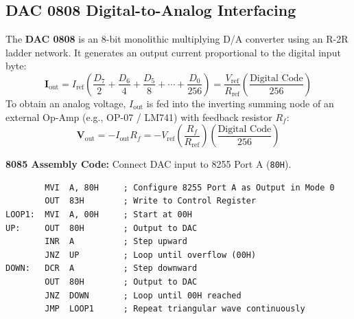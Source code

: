 \documentclass[12pt,a4paper]{article}
\begin{document}
\subsection{DAC 0808 Digital-to-Analog Interfacing}
\begin{tcolorbox}[defbox, title={DAC 0808 Specifications}]
The \textbf{DAC 0808} is an 8-bit monolithic multiplying D/A converter using an R-2R ladder network. It generates an output current proportional to the digital input byte:
\[
\mathbf{I_{\mathrm{out}}} = I_{\mathrm{ref}} \left( \frac{D_7}{2} + \frac{D_6}{4} + \frac{D_5}{8} + \cdots + \frac{D_0}{256} \right) = \frac{V_{\mathrm{ref}}}{R_{\mathrm{ref}}} \left( \frac{\text{Digital Code}}{256} \right)
\]
To obtain an analog voltage, $I_{\mathrm{out}}$ is fed into the inverting summing node of an external Op-Amp (e.g., OP-07 / LM741) with feedback resistor $R_f$:
\[
\mathbf{V_{\mathrm{out}}} = -I_{\mathrm{out}} R_f = -V_{\mathrm{ref}} \left(\frac{R_f}{R_{\mathrm{ref}}}\right) \left( \frac{\text{Digital Code}}{256} \right)
\]
\end{tcolorbox}

\begin{tcolorbox}[examplebox, title={Generating a Triangular Waveform with DAC 0808}]
\textbf{8085 Assembly Code:} Connect DAC input to 8255 Port A (\texttt{80H}).
\begin{verbatim}
        MVI  A, 80H     ; Configure 8255 Port A as Output in Mode 0
        OUT  83H        ; Write to Control Register
LOOP1:  MVI  A, 00H     ; Start at 00H
UP:     OUT  80H        ; Output to DAC
        INR  A          ; Step upward
        JNZ  UP         ; Loop until overflow (00H)
DOWN:   DCR  A          ; Step downward
        OUT  80H        ; Output to DAC
        JNZ  DOWN       ; Loop until 00H reached
        JMP  LOOP1      ; Repeat triangular wave continuously
\end{verbatim}
\end{tcolorbox}
\end{document}
